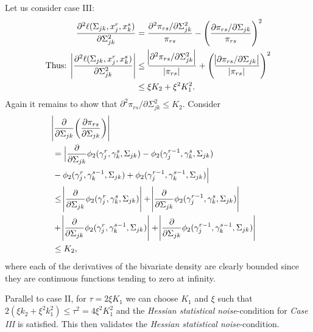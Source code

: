 \begin{condition}
    Let us consider case III:
    \begin{equation}\label{hessian_case3}
        \begin{split}
            \frac{\partial^2 \ell(\Sigma_{jk}, x_j^r,x_k^s)}{\partial \Sigma_{jk}^{2}} &= \frac{\partial^2 \pi_{rs}/\partial \Sigma_{jk}^{2}}{\pi_{rs}} - \Bigg(\frac{\partial \pi_{rs}/\partial \Sigma_{jk}}{\pi_{rs}}\Bigg)^2 \\
            \text{Thus: } \abs{\frac{\partial^2 \ell(\Sigma_{jk}, x_j^r,x_k^s)}{\partial \Sigma_{jk}^{2}}} &\leq \frac{\abs{\partial^2 \pi_{rs}/\partial \Sigma_{jk}^{2}}}{\abs{\pi_{rs}}} + \Bigg(\frac{\abs{\partial \pi_{rs}/\partial \Sigma_{jk}}}{\abs{\pi_{rs}}} \Bigg)^2 \\ 
            &\leq \xi K_2 + \xi^2K_1^2.
        \end{split}
    \end{equation}
    Again it remains to show that $\partial^2 \pi_{rs}/\partial \Sigma_{jk}^{2} \leq K_2$. Consider
    \begin{equation*}
        \begin{split}
        \lefteqn{\abs{\frac{\partial}{\partial \Sigma_{jk}}\bigg(\frac{\partial \pi_{rs}}{\partial \Sigma_{jk}}\bigg)}} \\
        &= \Big\lvert \frac{\partial}{\partial \Sigma_{jk}}\phi_2({\gamma}_j^r, {\gamma}_k^s, \Sigma_{jk}) - \phi_2({\gamma}_j^{r-1}, {\gamma}_k^s, \Sigma_{jk}) \\
        &- \phi_2({\gamma}_j^r, {\gamma}_k^{s-1}, \Sigma_{jk}) + \phi_2({\gamma}_j^{r-1}, {\gamma}_k^{s-1}, \Sigma_{jk})\Big\rvert \\
        &\leq \abs{\frac{\partial}{\partial \Sigma_{jk}}\phi_2({\gamma}_j^r, {\gamma}_k^s, \Sigma_{jk})} + \abs{\frac{\partial}{\partial \Sigma_{jk}}\phi_2({\gamma}_j^{r-1}, {\gamma}_k^s, \Sigma_{jk})} \\
        &+ \abs{\frac{\partial}{\partial \Sigma_{jk}}\phi_2({\gamma}_j^r, {\gamma}_k^{s-1}, \Sigma_{jk})} + \abs{\frac{\partial}{\partial \Sigma_{jk}}\phi_2({\gamma}_j^{r-1}, {\gamma}_k^{s-1}, \Sigma_{jk})} \\
        &\leq K_2,
        \end{split}
    \end{equation*}
    where each of the derivatives of the bivariate density are clearly bounded since they are continuous functions tending to zero at infinity.
    
    Parallel to case II, for $\tau = 2\xi K_1$ we can choose $K_1$ and $\xi$ such that $2(\xi k_2 + \xi^2 k_1^2) \leq \tau^2 = 4\xi^2 K_1^2$ and the \textit{Hessian statistical noise}-condition for \textit{Case III} is satisfied. This then validates the \textit{Hessian statistical noise}-condition. 
\end{condition} 

